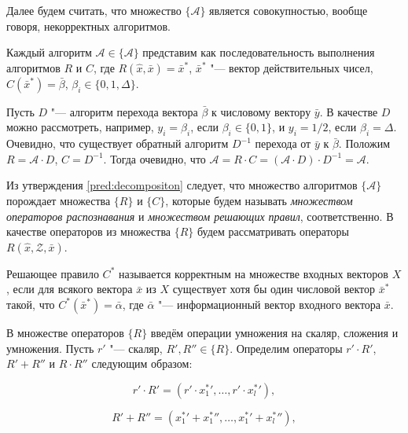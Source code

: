 Далее будем считать, что множество $\{\mathcal{A}\}$ является совокупностью, вообще говоря, некорректных алгоритмов.
	
\begin{Pred}
	\label{pred:decompositon}
	Каждый алгоритм $\mathcal{A}\in\{\mathcal{A}\}$ представим как последовательность выполнения алгоритмов $R$ и $C$, где $R(\hat{x},\bar{x})=\bar{x}^*$, $\bar{x}^*$ "--- вектор действительных чисел, $C(\bar{x}^*)=\bar{\beta}$, $\beta_i\in\{0,1,\Delta\}$.
\end{Pred}
	
\begin{Proof}
	Пусть $D$ "--- алгоритм перехода вектора $\bar{\beta}$ к числовому вектору $\bar{y}$. В качестве $D$ можно рассмотреть, например, $y_i=\beta_i$, если $\beta_i\in\{0,1\}$, и $y_i=1/2$, если $\beta_i=\Delta$. Очевидно, что существует обратный алгоритм $D^{-1}$ перехода от $\bar{y}$ к $\bar{\beta}$. Положим $R=\mathcal{A}{\cdot}D$, $C=D^{-1}$. Тогда очевидно, что $\mathcal{A}=R{\cdot}C=(\mathcal{A}{\cdot}D){\cdot}D^{-1}=\mathcal{A}$.
\end{Proof}

Из утверждения \ref{pred:decompositon} следует, что множество алгоритмов $\{\mathcal{A}\}$ порождает множества $\{R\}$ и $\{C\}$, которые будем называть \textit{множеством операторов распознавания} и \textit{множеством решающих правил}, соответственно. В качестве операторов из множества $\{R\}$ будем рассматривать операторы $R(\hat{x},\mathcal{Z},\bar{x})$.
	
\begin{Def}
	Решающее правило $C^*$ называется корректным на множестве входных векторов $X$, если для всякого вектора $\bar{x}$ из $X$ существует хотя бы один числовой вектор $\bar{x}^*$ такой, что $C^*(\bar{x}^*)=\bar{\alpha}$, где $\bar{\alpha}$ "--- информационный вектор входного вектора $\bar{x}$.
\end{Def}

В множестве операторов $\{R\}$ введём операции умножения на скаляр, сложения и умножения. Пусть $r'$ "--- скаляр, $R',R''\in\{R\}$. Определим операторы $r'{\cdot}R'$, $R'+R''$ и $R{\cdot}R''$ следующим образом:
	
\begin{equation}
\label{eq:oper_scalar}
	r'{\cdot}R'=(r'{\cdot}{x_1^*}',\dots,r'{\cdot}{x_l^*}'),
\end{equation}

\begin{equation}
\label{eq:oper_sum}
	R'+R''=({x_1^*}'+{x_1^*}'',\dots,{x_1^*}'+{x_l^*}''),
\end{equation}

